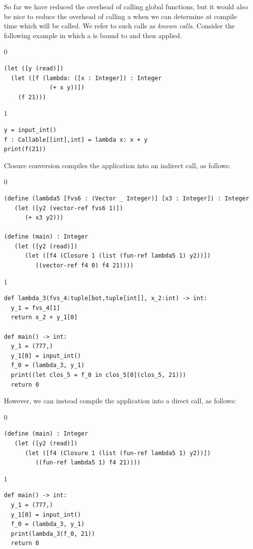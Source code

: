 \documentclass[7x10]{TimesAPriori_MIT}%
\def\racketEd{0}
\def\pythonEd{1}
\providecommand{\BookEdition}{1}
\let\edition\BookEdition
\newcommand{\pythonColor}[0]{}
\numberwithin{theorem}{chapter}
\numberwithin{definition}{chapter}
\numberwithin{equation}{chapter}
\begin{document}
So far we have reduced the overhead of calling global functions, but
it would also be nice to reduce the overhead of calling a
 when we can determine at compile time which
 will be called. We refer to such calls as \emph{known
  calls}.  Consider the following example in which a  is
bound to  and then applied.
{\if\edition\racketEd
\begin{lstlisting}
(let ([y (read)])
  (let ([f (lambda: ([x : Integer]) : Integer
             (+ x y))])
    (f 21)))
\end{lstlisting}
\fi}
{\if\edition\pythonEd\pythonColor
\begin{lstlisting}
y = input_int()
f : Callable[[int],int] = lambda x: x + y
print(f(21))
\end{lstlisting}
\fi}
%
\noindent Closure conversion compiles the application
 into an indirect call, as follows:
%
{\if\edition\racketEd
\begin{lstlisting}
(define (lambda5 [fvs6 : (Vector _ Integer)] [x3 : Integer]) : Integer
   (let ([y2 (vector-ref fvs6 1)])
      (+ x3 y2)))

(define (main) : Integer
   (let ([y2 (read)])
      (let ([f4 (Closure 1 (list (fun-ref lambda5 1) y2))])
         ((vector-ref f4 0) f4 21))))
\end{lstlisting}
\fi}
{\if\edition\pythonEd\pythonColor
\begin{lstlisting}
def lambda_3(fvs_4:tuple[bot,tuple[int]], x_2:int) -> int:
  y_1 = fvs_4[1]
  return x_2 + y_1[0]

def main() -> int:
  y_1 = (777,)
  y_1[0] = input_int()
  f_0 = (lambda_3, y_1)
  print((let clos_5 = f_0 in clos_5[0](clos_5, 21)))
  return 0
\end{lstlisting}
\fi}
%
\noindent However, we can instead compile the application
 into a direct call, as follows:
%
{\if\edition\racketEd
\begin{lstlisting}
(define (main) : Integer
   (let ([y2 (read)])
      (let ([f4 (Closure 1 (list (fun-ref lambda5 1) y2))])
         ((fun-ref lambda5 1) f4 21))))
\end{lstlisting}
\fi}
{\if\edition\pythonEd\pythonColor
\begin{lstlisting}
def main() -> int:
  y_1 = (777,)
  y_1[0] = input_int()
  f_0 = (lambda_3, y_1)
  print(lambda_3(f_0, 21))
  return 0
\end{lstlisting}
\fi}
\end{document}

